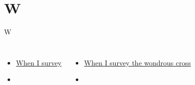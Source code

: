 \documentclass[aspectratio=169]{beamer}
\begin{document}
\section{ W }

\begin{frame}[t]{W}
\begin{columns}[t]
\begin{itemize}
    \item \hyperlink{The wonderful cross['When I survey'](Tomlin)}{When I survey}
    \item[] \phantom{1}
\end{itemize}
\begin{itemize}
    \item \hyperlink{When I survey the wondrous cross[](Watts)}{When I survey the wondrous cross}
    \item[] \phantom{1}
\end{itemize}
\end{columns}
\end{frame}
\end{document}
